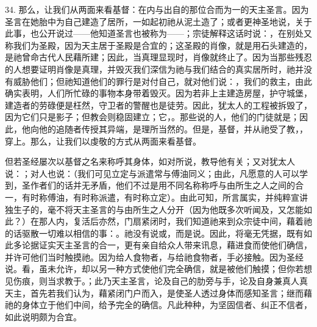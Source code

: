 34. 那么，让我们从两面来看基督：在内与出自的那位合而为一的天主圣言。因为圣言在她胎中为自己建造了居所，一如起初祂从泥土造了；或者更神圣地说，关于此事，也公开说过——他知道圣言也被称为——；宗徒解释这话时说：，在别处又称我们为圣殿，因为天主居于圣殿是合宜的；这圣殿的肖像，就是用石头建造的，是祂曾命古代人民藉所建；因此，当真理显现时，肖像就终止了。因为当那些残忍的人想要证明肖像是真理，并毁灭我们深信为祂与我们结合的真实居所时，祂并没有威胁他们；但祂知道他们的罪行是对付自己，就对他们说：，我们的救主，由此确实表明，人们所忙碌的事物本身带着毁灭。因为若非上主建造房屋，护守城堡，建造者的劳碌便是枉然，守卫者的警醒也是徒劳。因此，犹太人的工程被拆毁了，因为它们只是影子；但教会则稳固建立；它，。那些说的人，他们的门徒就是；因此，他向他的追随者传授其异端，是理所当然的。但是，基督，并从祂受了教，，穿上。那么，让我们以虔敬的方式从两面来看基督。\par

但若圣经屡次以基督之名来称呼其身体，如对所说，教导他有关；又对犹太人说：；对人也说：（我们可见立定与派遣常与傅油同义；由此，凡愿意的人可以学到，圣作者们的话并无矛盾，他们不过是用不同名称称呼与由所生之人之间的合一，有时称傅油，有时称派遣，有时称立定）。由此可知，所言属实，并纯粹宣讲独生子的，毫不将天主圣言的与由所生之人分开（因为他既多次听闻及，又怎能如此？）在那人内，复活后亦然，门扇紧闭时，我们知道祂来到众宗徒中间，藉着祂的话驱散一切难以相信的事：。祂没有说或，而是说。因此，将毫无凭据，既有如此多论据证实天主圣言的合一，更有亲自给众人带来讯息，藉进食而使他们确信，并许可他们当时触摸祂。因为给人食物者，与给祂食物者，手必接触。因为圣经说。看，虽未允许，却以另一种方式使他们完全确信，就是被他们触摸；但你若想见伤痕，则当求教于。；此乃天主圣言，论及自己的肋旁与手，论及自身兼真人真天主，首先若我们认为，藉紧闭门户而入，是使圣人透过身体而感知圣言；继而藉祂的身体立于他们中间，给予完全的确信。凡此种种，为坚固信者、纠正不信者，如此说明颇为合宜。\par

